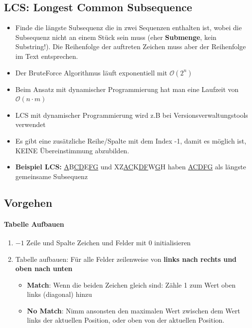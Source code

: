 \subsection{LCS: Longest Common Subsequence}
\begin{itemize}
	\item Finde die längste Subsequenz die in zwei Sequenzen enthalten ist, wobei die Subsequenz nicht an einem Stück sein muss (eher \textbf{Submenge}, kein Substring!). Die Reihenfolge der auftreten Zeichen muss aber der Reihenfolge im Text entsprechen.
	\item Der BruteForce Algorithmus läuft exponentiell mit $\mathcal{O}(2^n)$
	\item Beim Ansatz mit dynamischer Programmierung hat man eine Laufzeit von $\mathcal{O}(n \cdot m)$
	\item LCS mit dynamischer Programmierung wird z.B bei Versionsverwaltungstools verwendet
	\item Es gibt eine zusätzliche Reihe/Spalte mit dem Index -1, damit es möglich ist, KEINE Übereinstimmung abzubilden.
	\item \textbf{Beispiel LCS:} \underline{A}B\underline{CD}E\underline{FG} und XZ\underline{AC}K\underline{DF}W\underline{G}H haben \underline{ACDFG} als längste gemeinsame Subsequenz
\end{itemize}

\clearpage

\subsection{Vorgehen}
\paragraph{Tabelle Aufbauen}
\begin{enumerate}
	\item $-1$ Zeile und Spalte Zeichen und Felder mit 0 initialisieren
	\item Tabelle aufbauen: Für alle Felder zeilenweise von \textbf{links nach rechts und oben nach unten}
	\begin{itemize}
		\item \textbf{Match}: Wenn die beiden Zeichen gleich sind: Zähle 1 zum Wert oben links (diagonal) hinzu
		\item \textbf{No Match}: Nimm ansonsten den maximalen Wert zwischen dem Wert links der aktuellen Position, oder oben von der aktuellen Position.
	\end{itemize}
\end{enumerate}

